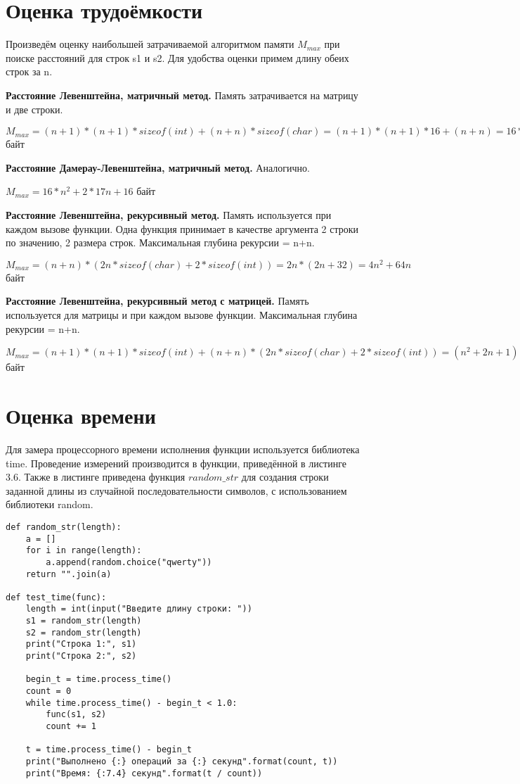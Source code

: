 \section{Оценка трудоёмкости}
Произведём оценку наибольшей затрачиваемой алгоритмом памяти $M_{max}$ при поиске расстояний для строк s1 и s2. Для удобства оценки примем длину обеих строк за n.

\textbf{Расстояние Левенштейна, матричный метод.} 
Память затрачивается на матрицу и две строки.
\par $M_{max} = (n+1)*(n+1)*sizeof(int) + (n+n)*sizeof(char) = 
(n+1)*(n+1)*16 + (n+n) = 16*n^2 + 2*17n + 16 $ байт

\textbf{Расстояние Дамерау-Левенштейна, матричный метод.} 
Аналогично.
\par $M_{max} = 16*n^2 + 2*17n + 16 $ байт

\textbf{Расстояние Левенштейна, рекурсивный метод. }
Память используется при каждом вызове функции. Одна функция принимает в качестве аргумента 2 строки по значению, 2 размера строк. Максимальная глубина рекурсии = n+n.
\par $M_{max} = (n+n)*(2n*sizeof(char) + 2*sizeof(int)) = 2n*(2n + 32) = 4n^2 + 64n $ байт

\textbf{Расстояние Левенштейна, рекурсивный метод с матрицей.} 
Память используется для матрицы и при каждом вызове функции. Максимальная глубина рекурсии = n+n.
\par $M_{max} = (n+1)*(n+1)*sizeof(int) + (n+n)*(2n*sizeof(char) + 2*sizeof(int)) = (n^2+2n+1)*16 + 2n*(2n + 32) = 20n^2 + 96n  + 16 $ байт

\section{Оценка времени}
Для замера процессорного времени исполнения функции используется библиотека time. Проведение измерений производится в функции, приведённой в листинге 3.6. Также в листинге приведена функция $random\_str$ для создания строки заданной длины из случайной последовательности символов, с использованием библиотеки random.

\begin{lstlisting}[caption = Функция замера процессорного времени работы функции]
def random_str(length):
	a = []
	for i in range(length):
		a.append(random.choice("qwerty"))
	return "".join(a)

def test_time(func):
	length = int(input("Введите длину строки: "))
	s1 = random_str(length)
	s2 = random_str(length)
	print("Строка 1:", s1)
	print("Строка 2:", s2)
	
	begin_t = time.process_time()
	count = 0
	while time.process_time() - begin_t < 1.0:
		func(s1, s2)
		count += 1
	
	t = time.process_time() - begin_t
	print("Выполнено {:} операций за {:} секунд".format(count, t))
	print("Время: {:7.4} секунд".format(t / count))
	\end{lstlisting}

